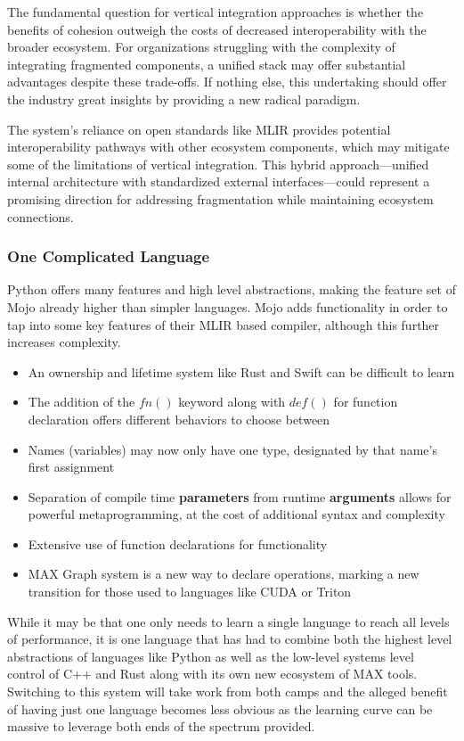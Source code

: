 \documentclass[manuscript,screen,review,format=acmsmall]{acmart}
\begin{document}
The fundamental question for vertical integration approaches is whether the benefits of cohesion outweigh the costs of decreased interoperability with the broader ecosystem. For organizations struggling with the complexity of integrating fragmented components, a unified stack may offer substantial advantages despite these trade-offs. If nothing else, this undertaking should offer the industry great insights by providing a new radical paradigm.

The system's reliance on open standards like MLIR provides potential interoperability pathways with other ecosystem components, which may mitigate some of the limitations of vertical integration. This hybrid approach—unified internal architecture with standardized external interfaces—could represent a promising direction for addressing fragmentation while maintaining ecosystem connections.

\subsubsection{One Complicated Language}

Python offers many features and high level abstractions, making the feature set of Mojo already higher than simpler languages. Mojo adds functionality in order to tap into some key features of their MLIR based compiler, although this further increases complexity.

\begin{itemize}
    \item An ownership and lifetime system like Rust and Swift can be difficult to learn
    \item The addition of the $fn()$ keyword along with $def()$ for function declaration offers different behaviors to choose between
    \item Names (variables) may now only have one type, designated by that name's first assignment
    \item Separation of compile time \textbf{parameters} from runtime \textbf{arguments} allows for powerful metaprogramming, at the cost of additional syntax and complexity
    \item Extensive use of function declarations for functionality
    \item MAX Graph system is a new way to declare operations, marking a new transition for those used to languages like CUDA or Triton
\end{itemize}

While it may be that one only needs to learn a single language to reach all levels of performance, it is one language that has had to combine both the highest level abstractions of languages like Python as well as the low-level systems level control of C++ and Rust along with its own new ecosystem of MAX tools. Switching to this system will take work from both camps and the alleged benefit of having just one language becomes less obvious as the learning curve can be massive to leverage both ends of the spectrum provided.
\end{document}
